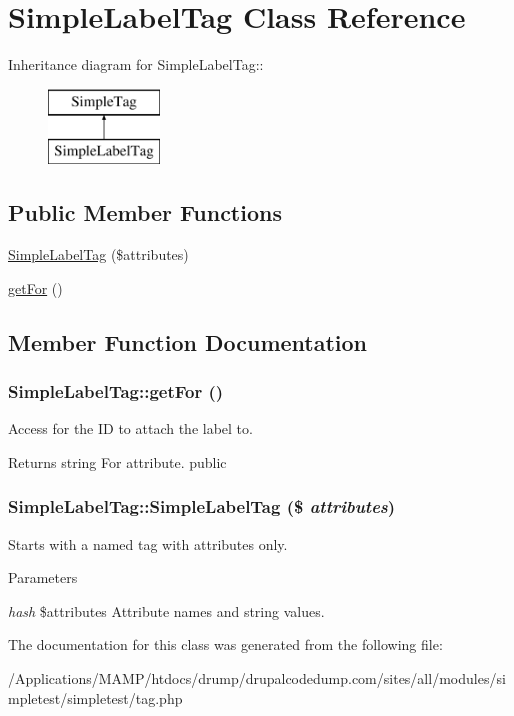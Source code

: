 \hypertarget{class_simple_label_tag}{
\section{SimpleLabelTag Class Reference}
\label{class_simple_label_tag}
}
Inheritance diagram for SimpleLabelTag::\begin{figure}[H]
\begin{center}
\leavevmode
\includegraphics[height=2cm]{class_simple_label_tag}
\end{center}
\end{figure}
\subsection*{Public Member Functions}
\begin{DoxyCompactItemize}
\item 
\hyperlink{class_simple_label_tag_a9749e578425d7026c0237df30a0af2ea}{SimpleLabelTag} (\$attributes)
\item 
\hyperlink{class_simple_label_tag_ab86db623cb49207a9a56250590a82444}{getFor} ()
\end{DoxyCompactItemize}


\subsection{Member Function Documentation}
\hypertarget{class_simple_label_tag_ab86db623cb49207a9a56250590a82444}{
\subsubsection[{getFor}]{\setlength{\rightskip}{0pt plus 5cm}SimpleLabelTag::getFor ()}}
\label{class_simple_label_tag_ab86db623cb49207a9a56250590a82444}
Access for the ID to attach the label to. \begin{DoxyReturn}{Returns}
string For attribute.  public 
\end{DoxyReturn}
\hypertarget{class_simple_label_tag_a9749e578425d7026c0237df30a0af2ea}{
\subsubsection[{SimpleLabelTag}]{\setlength{\rightskip}{0pt plus 5cm}SimpleLabelTag::SimpleLabelTag (\$ {\em attributes})}}
\label{class_simple_label_tag_a9749e578425d7026c0237df30a0af2ea}
Starts with a named tag with attributes only. 
\begin{DoxyParams}{Parameters}
\item[{\em hash}]\$attributes Attribute names and string values. \end{DoxyParams}


The documentation for this class was generated from the following file:\begin{DoxyCompactItemize}
\item 
/Applications/MAMP/htdocs/drump/drupalcodedump.com/sites/all/modules/simpletest/simpletest/tag.php\end{DoxyCompactItemize}

